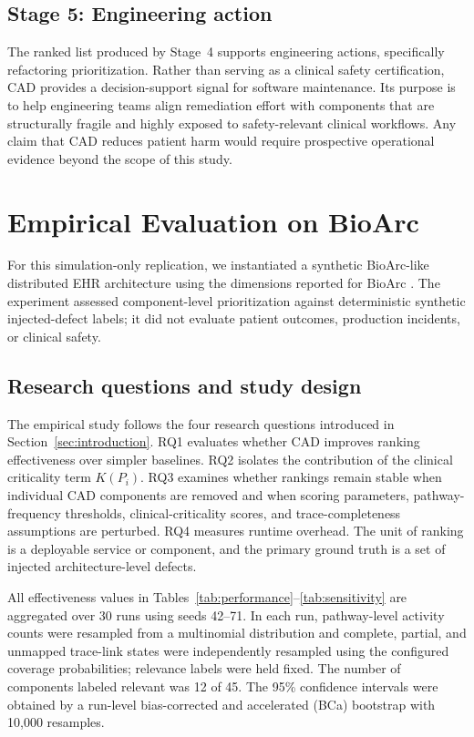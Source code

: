 \documentclass[english,preprint]{elsarticle}
\newcommand{\CAD}{\textsc{CAD}\xspace}
\begin{document}
\subsection{Stage 5: Engineering action}

The ranked list produced by Stage~4 supports engineering actions, specifically refactoring prioritization. Rather than serving as a clinical safety certification, \CAD provides a decision-support signal for software maintenance. Its purpose is to help engineering teams align remediation effort with components that are structurally fragile and highly exposed to safety-relevant clinical workflows. Any claim that \CAD reduces patient harm would require prospective operational evidence beyond the scope of this study.

\section{Empirical Evaluation on BioArc}\label{sec:evaluation}

For this simulation-only replication, we instantiated a synthetic BioArc-like distributed EHR architecture using the dimensions reported for BioArc \cite{BioArc2026}. The experiment assessed component-level prioritization against deterministic synthetic injected-defect labels; it did not evaluate patient outcomes, production incidents, or clinical safety.

\subsection{Research questions and study design}

The empirical study follows the four research questions introduced in Section~\ref{sec:introduction}. RQ1 evaluates whether \CAD improves ranking effectiveness over simpler baselines. RQ2 isolates the contribution of the clinical criticality term $K(P_i)$. RQ3 examines whether rankings remain stable when individual \CAD components are removed and when scoring parameters, pathway-frequency thresholds, clinical-criticality scores, and trace-completeness assumptions are perturbed. RQ4 measures runtime overhead. The unit of ranking is a deployable service or component, and the primary ground truth is a set of injected architecture-level defects.

All effectiveness values in Tables~\ref{tab:performance}--\ref{tab:sensitivity} are aggregated over 30 runs using seeds 42--71. In each run, pathway-level activity counts were resampled from a multinomial distribution and complete, partial, and unmapped trace-link states were independently resampled using the configured coverage probabilities; relevance labels were held fixed. The number of components labeled relevant was 12 of 45. The 95\% confidence intervals were obtained by a run-level bias-corrected and accelerated (BCa) bootstrap with 10,000 resamples.
\end{document}
